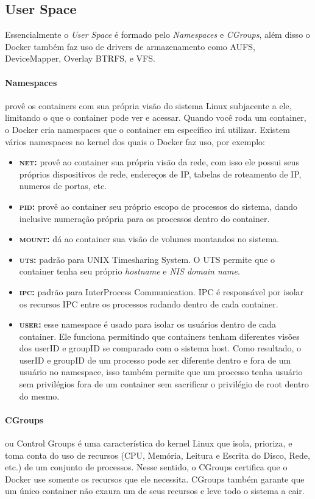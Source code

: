 \documentclass[twocolumn, letterpaper]{scrartcl}
\begin{document}
\subsection*{\color{triton_blue}User Space}
Essencialmente o \textit{User Space} é formado pelo \textit{Namespaces} e \textit{CGroups}, além disso o Docker também faz uso de drivers de armazenamento como AUFS, DeviceMapper, Overlay BTRFS, e VFS.
\paragraph{Namespaces} provê os containers com sua própria visão do sistema Linux subjacente a ele, limitando o que o container pode ver e acessar. Quando você roda um container, o Docker cria namespaces que o container em específico irá utilizar. Existem vários namespaces no kernel dos quais o Docker faz uso, por exemplo:
\begin{itemize}
    \item \textsc{\textbf{net:}} provê ao container sua própria visão da rede, com isso ele possui seus próprios dispositivos de rede, endereços de IP, tabelas de roteamento de IP, numeros de portas, etc.
    \item \textsc{\textbf{pid:}} provê ao container seu próprio escopo de processos do sistema, dando inclusive numeração própria para os processos dentro do container.
    \item \textsc{\textbf{mount:}} dá ao container sua visão de volumes montandos no sistema.
    \item \textsc{\textbf{uts:}} padrão para UNIX Timesharing System. O UTS permite que o container tenha seu próprio \textit{hostname} e \textit{NIS domain name}.
    \item \textsc{\textbf{ipc:}} padrão para InterProcess Communication. IPC é responsável por isolar os recursos IPC entre os processos rodando dentro de cada container.
    \item \textsc{\textbf{user:}} esse namespace é usado para isolar os usuários dentro de cada container. Ele funciona permitindo que containers tenham diferentes visões dos userID e groupID se comparado com o sistema host. Como resultado, o userID e groupID de um processo pode ser diferente dentro e fora de um usuário no namespace, isso também permite que um processo tenha usuário sem privilégios fora de um container sem sacrificar o privilégio de root dentro do mesmo.
\end{itemize}
\paragraph{CGroups} ou Control Groups é uma característica do kernel Linux que isola, prioriza, e toma conta do uso de recursos (CPU, Memória, Leitura e Escrita do Disco, Rede, etc.) de um conjunto de processos. Nesse sentido, o CGroups certifica que o Docker use somente os recursos que ele necessita. CGroups também garante que um único container não exaura um de seus recursos e leve todo o sistema a cair.
\end{document}
